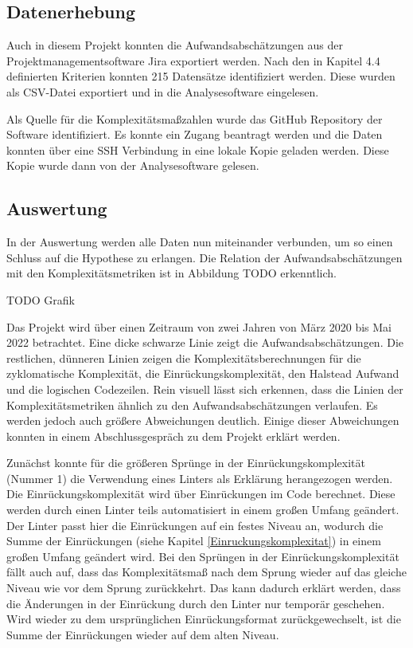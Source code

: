 \subsection{Datenerhebung}\label{Alstonii-Datenerhebung}

Auch in diesem Projekt konnten die Aufwandsabschätzungen aus der
Projektmanagementsoftware Jira exportiert werden. Nach den in Kapitel
4.4 definierten Kriterien konnten 215 Datensätze identifiziert werden.
Diese wurden als CSV-Datei exportiert und in die Analysesoftware
eingelesen.

Als Quelle für die Komplexitätsmaßzahlen wurde das GitHub Repository der
Software identifiziert. Es konnte ein Zugang beantragt werden und die
Daten konnten über eine \ac{SSH} Verbindung in eine lokale Kopie geladen
werden. Diese Kopie wurde dann von der Analysesoftware gelesen.

\subsection{Auswertung}\label{Alstonii-Auswertung}

In der Auswertung werden alle Daten nun miteinander verbunden, um so
einen Schluss auf die Hypothese zu erlangen. Die Relation der
Aufwandsabschätzungen mit den Komplexitätsmetriken ist in Abbildung TODO
erkenntlich.

TODO Grafik

Das Projekt wird über einen Zeitraum von zwei Jahren von März 2020 bis
Mai 2022 betrachtet. Eine dicke schwarze Linie zeigt die
Aufwandsabschätzungen. Die restlichen, dünneren Linien zeigen die
Komplexitätsberechnungen für die zyklomatische Komplexität, die
Einrückungskomplexität, den Halstead Aufwand und die logischen
Codezeilen. Rein visuell lässt sich erkennen, dass die Linien der
Komplexitätsmetriken ähnlich zu den Aufwandsabschätzungen verlaufen. Es
werden jedoch auch größere Abweichungen deutlich. Einige dieser
Abweichungen konnten in einem Abschlussgespräch zu dem Projekt erklärt
werden.

Zunächst konnte für die größeren Sprünge in der Einrückungskomplexität
(Nummer 1) die Verwendung eines Linters als Erklärung herangezogen
werden. Die Einrückungskomplexität wird über Einrückungen im Code
berechnet. Diese werden durch einen Linter teils automatisiert in einem
großen Umfang geändert. Der Linter passt hier die Einrückungen auf ein
festes Niveau an, wodurch die Summe der Einrückungen (siehe Kapitel \ref{Einruckungskomplexitat}) in
einem großen Umfang geändert wird. Bei den Sprüngen in der
Einrückungskomplexität fällt auch auf, dass das Komplexitätsmaß nach dem
Sprung wieder auf das gleiche Niveau wie vor dem Sprung zurückkehrt. Das
kann dadurch erklärt werden, dass die Änderungen in der Einrückung durch
den Linter nur temporär geschehen. Wird wieder zu dem ursprünglichen
Einrückungsformat zurückgewechselt, ist die Summe der Einrückungen
wieder auf dem alten Niveau.

